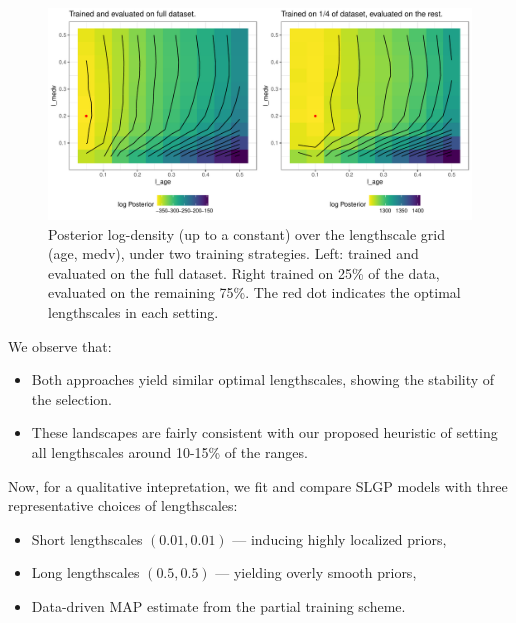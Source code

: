 \documentclass[
]{article}
\begin{document}
\begin{figure}[H]

{\centering \includegraphics{IntroductionSLGP_files/figure-latex/optimlandscape-1} 

}

\caption{Posterior log-density (up to a constant) over the lengthscale grid (age, medv), under two training strategies. Left: trained and evaluated on the full dataset. Right trained on 25\% of the data, evaluated on the remaining 75\%. The red dot indicates the optimal lengthscales in each setting.}\label{fig:optimlandscape}
\end{figure}

We observe that:

\begin{itemize}
\item
  Both approaches yield similar optimal lengthscales, showing the stability of the selection.
\item
  These landscapes are fairly consistent with our proposed heuristic of setting all lengthscales around 10-15\% of the ranges.
\end{itemize}

Now, for a qualitative intepretation, we fit and compare SLGP models with three representative choices of lengthscales:

\begin{itemize}
\item
  Short lengthscales \((0.01, 0.01)\) --- inducing highly localized priors,
\item
  Long lengthscales \((0.5, 0.5)\) --- yielding overly smooth priors,
\item
  Data-driven MAP estimate from the partial training scheme.
\end{itemize}
\end{document}
